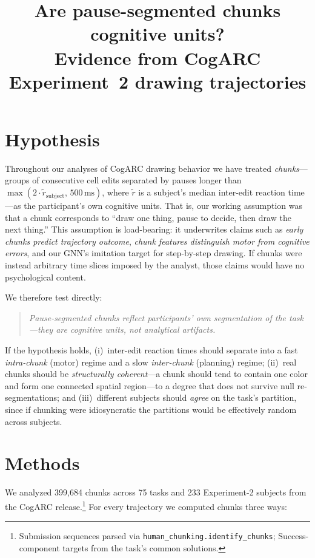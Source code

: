 \documentclass[11pt]{article}
\title{Are pause-segmented chunks cognitive units?\\
       Evidence from CogARC Experiment~2 drawing trajectories}
\author{}
\date{}
\begin{document}
\maketitle

\section*{Hypothesis}

Throughout our analyses of CogARC drawing behavior we have treated
\emph{chunks}---groups of consecutive cell edits separated by pauses
longer than $\max(2 \cdot \tilde{r}_{\text{subject}},\, 500\,\text{ms})$,
where $\tilde{r}$ is a subject's median inter-edit reaction time---as
the participant's own cognitive units. That is, our working assumption
was that a chunk corresponds to ``draw one thing, pause to decide, then
draw the next thing.'' This assumption is load-bearing: it underwrites
claims such as \textit{early chunks predict trajectory outcome},
\textit{chunk features distinguish motor from cognitive errors}, and
our GNN's imitation target for step-by-step drawing. If chunks were
instead arbitrary time slices imposed by the analyst, those claims
would have no psychological content.

We therefore test directly:

\begin{quote}
\textit{Pause-segmented chunks reflect participants' own segmentation
of the task---they are cognitive units, not analytical artifacts.}
\end{quote}

If the hypothesis holds, (i)~inter-edit reaction times should separate
into a fast \emph{intra-chunk} (motor) regime and a slow
\emph{inter-chunk} (planning) regime; (ii)~real chunks should be
\emph{structurally coherent}---a chunk should tend to contain one color
and form one connected spatial region---to a degree that does not
survive null re-segmentations; and (iii)~different subjects should
\emph{agree} on the task's partition, since if chunking were
idiosyncratic the partitions would be effectively random across
subjects.

\section*{Methods}

We analyzed 399{,}684 chunks across 75 tasks and 233 Experiment-2
subjects from the CogARC release.\footnote{Submission sequences parsed
via \texttt{human\_chunking.identify\_chunks}; Success-component
targets from the task's common solutions.} For every trajectory we
computed chunks three ways:
\end{document}
